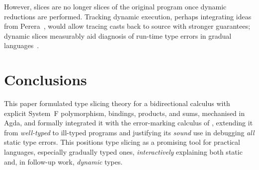 However, slices are no longer slices of the original program once dynamic reductions are performed. Tracking dynamic execution, perhaps integrating ideas from Perera~\cite{Perera2012,PereraGarg2016}, would allow tracing casts back to source with stronger guarantees; dynamic slices measurably aid diagnosis of run-time type errors in gradual languages~\cite{TypeSlicer2025}.

\section{Conclusions}
\label{sec:conclusions}

This paper formulated type slicing theory for a bidirectional calculus with explicit System~F polymorphism, bindings, products, and sums, mechanised in Agda, and formally integrated it with the error-marking calculus of \citet{Marking2024}, extending it from \textit{well-typed} to ill-typed programs and justifying its \textit{sound} use in debugging \textit{all} static type errors. This positions type slicing as a promising tool for practical languages, especially gradually typed ones, \textit{interactively} explaining both static and, in follow-up work, \textit{dynamic} types.

\label{lastcontentpage}

